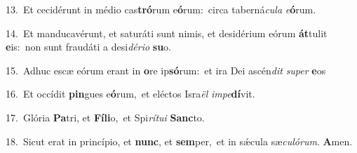 {\numbfont\textcolor{\numbcolor}{13.}}~Et cecidérunt in médio cas\-\textbf{tró}\-rum e\-\textbf{ó}\-rum:~\star circa taberná\-\textit{cu}\-\textit{la} \textit{e}\-\textbf{ó}rum.\par
{\numbfont\textcolor{\numbcolor}{14.}}~Et manducavérunt, et saturáti sunt nimis, et desidérium eórum \textbf{át}\-tulit \textbf{e}\-is:~\star non sunt fraudáti a desi\-\textit{dé}\-\textit{ri}\textit{o} \textbf{su}\-o.\par
{\numbfont\textcolor{\numbcolor}{15.}}~Adhuc escæ eórum erant in \textbf{o}\-re ip\-\textbf{só}\-rum:~\star et ira Dei ascén\textit{dit} \textit{su}\-\textit{per} \textbf{e}\-os\par
{\numbfont\textcolor{\numbcolor}{16.}}~Et occídit \textbf{pin}\-gues e\-\textbf{ó}\-rum,~\star et eléctos Isra\textit{ël} \textit{im}\-\textit{pe}\textbf{dí}vit.\par
{\numbfont\textcolor{\numbcolor}{17.}}~Glória \textbf{Pa}\-tri, et \textbf{Fí}\-\textbf{li}o,~\star et Spi\-\textit{rí}\-\textit{tu}\textit{i} \textbf{Sanc}\-to.\par
{\numbfont\textcolor{\numbcolor}{18.}}~Sicut erat in princípio, et \textbf{nunc}\-, et \textbf{sem}\-per,~\star et in sǽcula sæ\-\textit{cu}\-\textit{ló}\textit{rum}. \textbf{A}\-men.\par
